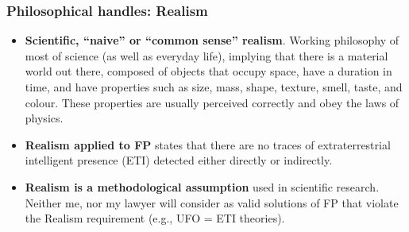 %


\begin{frame}
\frametitle{Philosophical handles: Realism}

\begin{itemize}
\item {\bf Scientific, ``naive'' or ``common sense'' realism}.  Working philosophy of most of science (as well as everyday life), implying that there is a material world out there, composed of objects that occupy space, have a duration in time, and have properties such as size, mass, shape, texture, smell, taste, and colour. These properties are usually perceived correctly and obey the laws of physics. 
\item {\bf Realism applied to FP} states that there are no traces of extraterrestrial intelligent presence (ETI) detected either directly or indirectly.

\item {\bf Realism is a methodological assumption} used in scientific research. Neither me, nor my lawyer will consider as valid solutions of FP that violate the Realism requirement (e.g., UFO = ETI theories).  
\end{itemize}

\end{frame}

